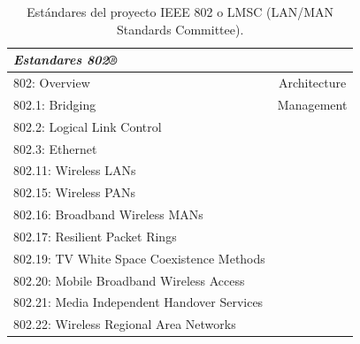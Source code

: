 

\vspace{10px}

\begin{table}[ht]
	\centering
	\caption{Estándares del proyecto IEEE 802 o LMSC (LAN/MAN Standards Committee).}
	\begin{tabular}{@{} l *1c @{}}    \toprule
		\emph{\textbf{Estandares 802®}} \\
		\midrule
        802: Overview & Architecture\\
        802.1: Bridging & Management\\
        802.2: Logical Link Control\\
        802.3: Ethernet\\
        802.11: Wireless LANs\\
        802.15: Wireless PANs\\
        802.16: Broadband Wireless MANs\\
        802.17: Resilient Packet Rings\\
        802.19: TV White Space Coexistence Methods\\
        802.20: Mobile Broadband Wireless Access\\
        802.21: Media Independent Handover Services\\
        802.22: Wireless Regional Area Networks\\
		\bottomrule
		\hline
	\end{tabular}
	\label{tab:802}
\end{table}

